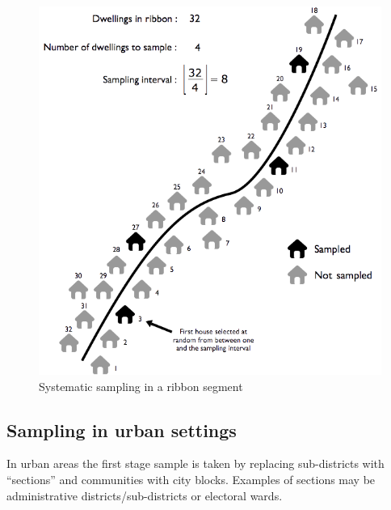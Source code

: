 \documentclass[12pt,a4paper]{book}
\theoremstyle{definition}
\theoremstyle{definition}
\theoremstyle{definition}
\theoremstyle{remark}
\begin{document}
\begin{figure}[H]

{\centering \includegraphics{figures/stage2sample9} 

}

\caption{Systematic sampling in a ribbon segment}\label{fig:sample23}
\end{figure}

\hypertarget{sampling-in-urban-settings}{%
\subsection{Sampling in urban
settings}\label{sampling-in-urban-settings}}

In urban areas the first stage sample is taken by replacing
sub-districts with ``sections'' and communities with city blocks.
Examples of sections may be administrative districts/sub-districts or
electoral wards.
\end{document}
